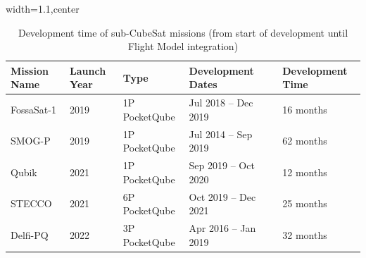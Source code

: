 \documentclass[a4paper,nobib,justified,final]{tufte-book}
\begin{document}
\begin{table}[b]
	\caption[Development time of sub-CubeSat missions]{Development time of sub-CubeSat missions (from start of development until Flight Model integration)}
	\label{tab:i_otherdevtime}
	\begin{adjustbox}{width=1.1\linewidth,center}
		\begin{tabularx}{\linewidth}{@{}llll@{\hskip 0.5em}lX@{}}
			\toprule
			Mission Name & Launch Year & Type & Development Dates & & Development Time \\ \midrule
			FossaSat-1 & 2019 & 1P PocketQube & Jul 2018 -- Dec 2019&  \cite{fossasat-1GithubCommits} & 16 months \\
			SMOG-P & 2019 & 1P PocketQube & Jul 2014 -- Sep 2019 & \cite{SMOG14thHungarian2021} & 62 months \\
			Qubik & 2021 & 1P PocketQube & Sep 2019 -- Oct 2020 & \cite{triantafyllopoulouQUBIKProjectReady2020} & 12 months \\
			STECCO & 2021 & 6P PocketQube & Oct 2019 -- Dec 2021 & \cite{sapienzauniversitadiromaSapienzaSkyStecco2021} & 25 months \\
			Delfi-PQ & 2022 & 3P PocketQube & Apr 2016 -- Jan 2019 & \cite{raduDelfiPQFirstPocketqube2018} & 32 months \\

\end{tabularx}
\end{adjustbox}
\end{table}
\end{document}
